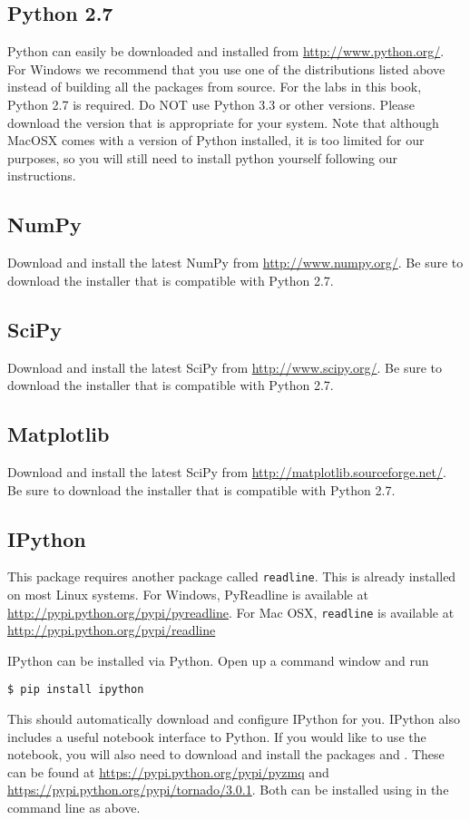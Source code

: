\subsection*{Python 2.7}
Python can easily be downloaded and installed from \url{http://www.python.org/}.
For Windows we recommend that you use one of the distributions listed above
instead of building all the packages from source.
For the labs in this book, Python 2.7 is required.
Do NOT use Python 3.3 or other versions.
Please download the version that is appropriate for your system.
Note that although MacOSX comes with a version of Python installed, it is
too limited for our purposes, so you will still need to install python yourself
following our instructions.

\subsection*{NumPy}
Download and install the latest NumPy from \url{http://www.numpy.org/}.
Be sure to download the installer that is compatible with Python 2.7.

\subsection*{SciPy}
Download and install the latest SciPy from \url{http://www.scipy.org/}.
Be sure to download the installer that is compatible with Python 2.7.

\subsection*{Matplotlib}
Download and install the latest SciPy from \url{http://matplotlib.sourceforge.net/}.
Be sure to download the installer that is compatible with Python 2.7.

\subsection*{IPython}
This package requires another package called \texttt{readline}.
This is already installed on most Linux systems.
For Windows, PyReadline is available at \url{http://pypi.python.org/pypi/pyreadline}.
For Mac OSX, \texttt{readline} is available at
\url{http://pypi.python.org/pypi/readline}

IPython can be installed via Python.
Open up a command window and run
\begin{lstlisting}
$ pip install ipython
\end{lstlisting}
This should automatically download and configure IPython for you.
IPython also includes a useful notebook interface to Python.
If you would like to use the notebook, you will also need to download and install
the packages  and .
These can be found at \url{https://pypi.python.org/pypi/pyzmq} and
\url{https://pypi.python.org/pypi/tornado/3.0.1}.
Both can be installed using  in the command line as above.

